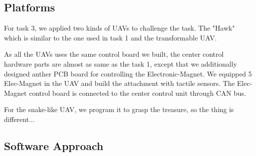 \documentclass{standalone}
\begin{document}
\subsection{Platforms}
For task 3, we applied two kinds of UAVs to challenge the task. The "Hawk" which is similar to the one used in task 1 and the transformable UAV.

As all the UAVs uses the same control board we built, the center control hardware parts are almost as same as the task 1, except that we additionally designed anther PCB board for controlling the Electronic-Magnet. We equipped 5 Elec-Magnet in the UAV and build the attachment with tactile sensors. The Elec-Magnet control board is connected to the center control unit through CAN bus.

For the snake-like UAV, we program it to grasp the treasure, so the thing is different...

\subsection{Software Approach}
\end{document}
